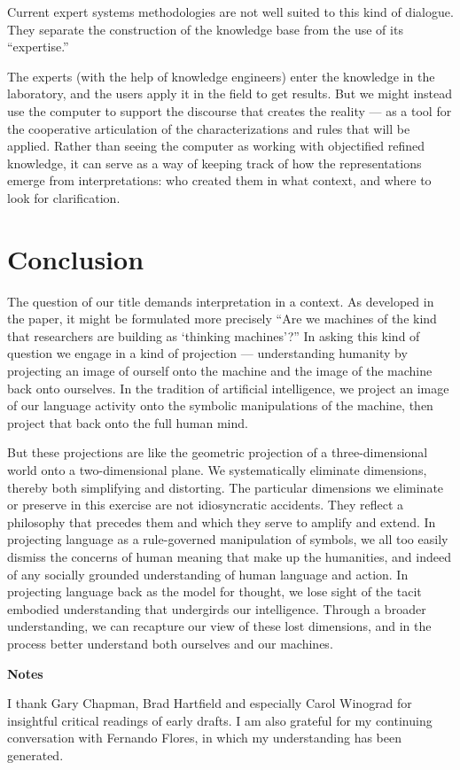 \documentclass[12pt]{article}
\begin{document}
Current expert systems methodologies are not well suited to this kind of dialogue. They separate the construction of the knowledge base from the use of its ``expertise.''

The experts (with the help of knowledge engineers) enter the knowledge in the laboratory, and the users apply it in the field to get results. But we might instead use the computer to support the discourse that creates the reality --- as a tool for the cooperative articulation of the characterizations and rules that will be applied. Rather than seeing the computer as working with objectified refined knowledge, it can serve as a way of keeping track of how the representations emerge from interpretations: who created them in what context, and where to look for clarification.

\section{Conclusion}

The question of our title demands interpretation in a context. As developed in the paper, it might be formulated more precisely ``Are we machines of the kind that researchers are building as `thinking machines'?'' In asking this kind of question we engage in a kind of projection --- understanding humanity by projecting an image of ourself onto the machine and the image of the machine back onto ourselves. In the tradition of artificial intelligence, we project an image of our language activity onto the symbolic manipulations of the machine, then project that back onto the full human mind.

But these projections are like the geometric projection of a three-dimensional world onto a two-dimensional plane. We systematically eliminate dimensions, thereby both simplifying and distorting. The particular dimensions we eliminate or preserve in this exercise are not idiosyncratic accidents. They reflect a philosophy that precedes them and which they serve to amplify and extend. In projecting language as a rule-governed manipulation of symbols, we all too easily dismiss the concerns of human meaning that make up the humanities, and indeed of any socially grounded understanding of human language and action. In projecting language back as the model for thought, we lose sight of the tacit embodied understanding that undergirds our intelligence. Through a broader understanding, we can recapture our view of these lost dimensions, and in the process better understand both ourselves and our machines.

\bigskip
\bigskip
\bigskip
\noindent
{\bf Notes}

\medskip
\noindent
I thank Gary Chapman, Brad Hartfield and especially Carol Winograd for insightful critical readings of early drafts. I am also grateful for my continuing conversation with Fernando Flores, in which my understanding has been generated.


\bigskip
\noindent

\printbibliography
\end{document}
